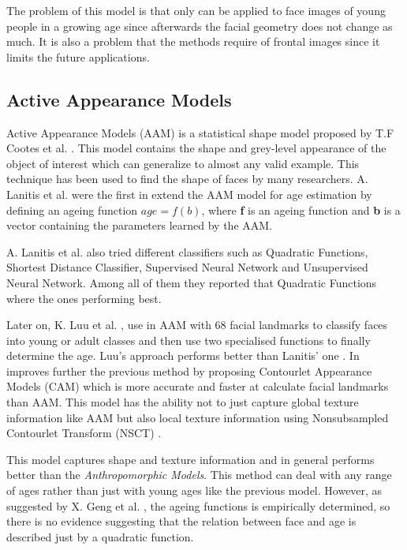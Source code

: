 The problem of this model is that only can be applied to face images of young people in a growing age since afterwards the facial geometry does not change as much. It is also a problem that the methods require of frontal images since it limits the future applications.

\subsection{Active Appearance Models}

Active Appearance Models (AAM) is a statistical shape model proposed by T.F Cootes et al. \cite{Cootes:2001:AAM:378040.378090}. This model contains the shape and grey-level appearance of the object of interest which can generalize to almost any valid example. This technique has been used to find the shape of faces by many researchers. A. Lanitis et al. \cite{791208, 993553, Lanitis:2004:CDC:2225304.2226166} were the first in extend the AAM model for age estimation by defining an ageing function $age=f(b)$, where \textbf{f} is an ageing function and \textbf{b} is a vector containing the parameters learned by the AAM.

A. Lanitis et al. \cite{Lanitis:2004:CDC:2225304.2226166} also tried different classifiers such as Quadratic Functions, Shortest Distance Classifier, Supervised Neural Network and Unsupervised Neural Network. Among all of them they reported that Quadratic Functions where the ones performing best.

Later on, K. Luu et al. \cite{Luu:2009:AEU:1736406.1736456, LuuSSBS11}, use in \cite{Luu:2009:AEU:1736406.1736456} AAM with 68 facial landmarks to classify faces into young or adult classes and then use two specialised functions to finally determine the age. Luu's approach performs better than Lanitis' one \cite{Lanitis:2004:CDC:2225304.2226166}. In \cite{LuuSSBS11} improves further the previous method by proposing Contourlet Appearance Models (CAM) which is more accurate and faster at calculate facial landmarks than AAM. This model has the ability not to just capture global texture information like AAM but also local texture information using Nonsubsampled Contourlet Transform (NSCT) \cite{1703596}.

This model captures shape and texture information and in general performs better than the \textit{Anthropomorphic Models}. This method can deal with any range of ages rather than just with young ages like the previous model. However, as suggested by X. Geng et al. \cite{Geng:2006:LFA:1180639.1180711}, the ageing functions is empirically determined, so there is no evidence suggesting that the relation between face and age is described just by a quadratic function.

